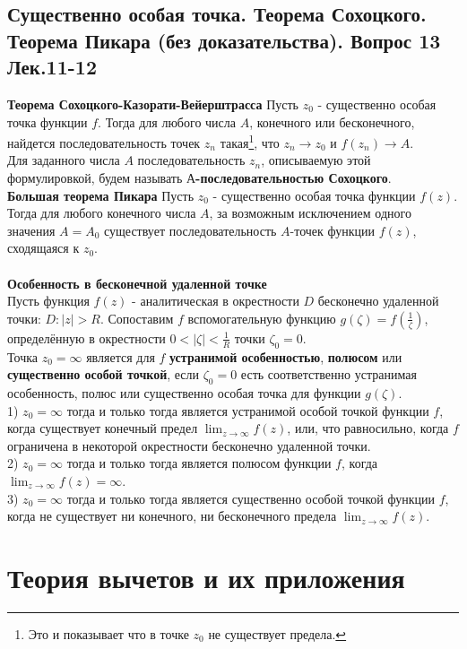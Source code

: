\documentclass{article}
\begin{document}
\subsection{Существенно особая точка. Теорема Сохоцкого. Теорема Пикара (без доказательства). Вопрос 13 Лек.11-12}
	\textbf{Теорема Сохоцкого-Казорати-Вейерштрасса} Пусть $ z_{0}$ - существенно особая точка функции $ f $. Тогда для любого числа $A$, конечного или бесконечного, найдется последовательность точек $ z_{n} $ такая\footnote{Это и показывает что в точке ${z}_{0}$ не существует предела.}, что $ z_{n} \rightarrow z_{0} $ и $ f\left(z_{n}\right) \rightarrow A$.\\ 
	Для заданного числа $ A $ последовательность $ z_{n}$, описываемую этой формулировкой, будем называть \textbf{$А$-последовательностью Сохоцкого}.\\
	\textbf{Большая теорема Пикара} Пусть $ z_{0}$ - существенно особая точка функции $ f(z) $. Тогда для любого конечного числа $ A$, за возможным исключением одного значения $ A=A_{0} $ существует последовательность $A$-точек функции $ f(z)$, сходящаяся к ${z}_{0}$.\\
	\\
	\textbf{Особенность в бесконечной удаленной точке}\\
	Пусть функция $ f(z)$ - аналитическая в окрестности $ D $ бесконечно удаленной точки:	$D:|z|>R$. Сопоставим $ f $ вспомогательную функцию	$g(\zeta)=f\left(\frac{1}{\zeta}\right)$, определённую в окрестности $0<|\zeta|<\frac{1}{R}$ точки $ \zeta_{0}=0$.\\
	Точка $z_{0}=\infty $ является для $ f $ \textbf{устранимой особенностью}, \textbf{полюсом} или \textbf{существенно особой точкой}, если $ \zeta_{0}=0 $ есть соответственно устранимая особенность, полюс или существенно особая точка для функции $ g(\zeta)$.\\
	1) $z_{0}=\infty $ тогда и только тогда является устранимой особой точкой функции $ f$, когда существует конечный предел $ \lim _{z \rightarrow \infty} f(z)$, или, что равносильно, когда $ f $ ограничена в некоторой окрестности бесконечно удаленной точки.\\
	2) $z_{0}=\infty $ тогда и только тогда является полюсом функции $ f$, когда $ \lim _{z \rightarrow \infty} f(z)=\infty$.\\ 
	3) $z_{0}=\infty $ тогда и только тогда является существенно особой точкой функции $ f$, когда не существует ни конечного, ни бесконечного предела $ \lim _{z \rightarrow \infty} f(z)$.   
\section{Теория вычетов и их приложения}
\end{document}
